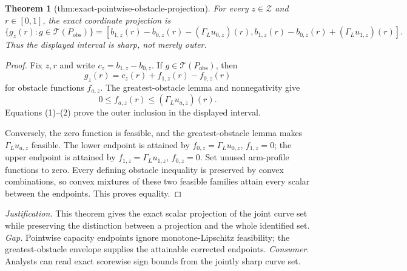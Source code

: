 \documentclass{article}
\newtheorem{theorem}{Theorem}
\begin{document}
\begin{theorem}[thm:exact-pointwise-obstacle-projection]\label{thm:exact-pointwise-obstacle-projection}
For every \(z\in\mathcal Z\) and \(r\in[0,1]\), the exact coordinate projection is
\[
\{g_z(r):g\in\mathcal T(P_{\mathrm{obs}})\}
=\left[
b_{1,z}(r)-b_{0,z}(r)-(\Gamma_Lu_{0,z})(r),
b_{1,z}(r)-b_{0,z}(r)+(\Gamma_Lu_{1,z})(r)
\right].
\]
Thus the displayed interval is sharp, not merely outer.
\end{theorem}
\begin{proof}
Fix \(z,r\) and write \(c_z=b_{1,z}-b_{0,z}\).  If \(g\in\mathcal T(P_{\mathrm{obs}})\), then
\[
g_z(r)=c_z(r)+f_{1,z}(r)-f_{0,z}(r)
\tag{1}
\]
for obstacle functions \(f_{a,z}\).  The greatest-obstacle lemma and nonnegativity give
\[
0\leq f_{a,z}(r)\leq(\Gamma_Lu_{a,z})(r).
\tag{2}
\]
Equations (1)--(2) prove the outer inclusion in the displayed interval.

Conversely, the zero function is feasible, and the greatest-obstacle lemma makes \(\Gamma_Lu_{a,z}\) feasible.  The lower endpoint is attained by \(f_{0,z}=\Gamma_Lu_{0,z}\), \(f_{1,z}=0\); the upper endpoint is attained by \(f_{1,z}=\Gamma_Lu_{1,z}\), \(f_{0,z}=0\).  Set unused arm-profile functions to zero.  Every defining obstacle inequality is preserved by convex combinations, so convex mixtures of these two feasible families attain every scalar between the endpoints.  This proves equality.
\end{proof}
\par\smallskip\noindent \textit{Justification.} This theorem gives the exact scalar projection of the joint curve set while preserving the distinction between a projection and the whole identified set. \textit{Gap.} Pointwise capacity endpoints ignore monotone-Lipschitz feasibility; the greatest-obstacle envelope supplies the attainable corrected endpoints. \textit{Consumer.} Analysts can read exact scorewise sign bounds from the jointly sharp curve set.
\end{document}
